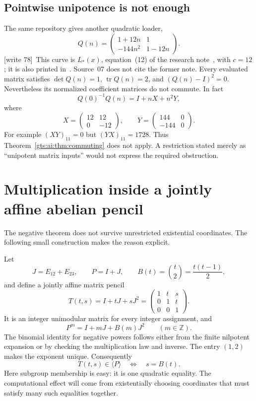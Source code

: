 \documentclass[11pt,letterpaper]{article}
\theoremstyle{definition}
\theoremstyle{remark}
\newcommand{\Z}{\mathbb Z}
\newcommand{\tr}{\operatorname{tr}}
\newcommand{\wtagb}{\textup{[write 78]}}
\begin{document}
\subsection{Pointwise unipotence is not enough}
The same repository gives another quadratic loader,
\begin{equation}\label{gts:ai:eq:Q}
 Q(n)=\begin{pmatrix}1+12n&1\\-144n^2&1-12n\end{pmatrix}.
\end{equation}
\wtagb\ This curve is $L_*(x)$, equation~(12) of the research note~\cite{repo-unip}, with $c=12$; it is also printed in~\cite{repo-comm}. Source~07 does not cite the former note.
Every evaluated matrix satisfies $\det Q(n)=1$, $\tr Q(n)=2$, and $(Q(n)-I)^2=0$. Nevertheless its normalized coefficient matrices do not commute. In fact
\[
 Q(0)^{-1}Q(n)=I+nX+n^2Y,
\]
where
\[
 X=\begin{pmatrix}12&12\\0&-12\end{pmatrix},\qquad
 Y=\begin{pmatrix}144&0\\-144&0\end{pmatrix}.
\]
For example $(XY)_{11}=0$ but $(YX)_{11}=1728$. Thus Theorem~\ref{gts:ai:thm:commuting} does not apply. A restriction stated merely as ``unipotent matrix inputs'' would not express the required obstruction.

\section{Multiplication inside a jointly affine abelian pencil}\label{gts:ai:sec:gadget}
The negative theorem does not survive unrestricted existential coordinates. The following small construction makes the reason explicit.

Let
\[
 J=E_{12}+E_{23},\qquad P=I+J,
 \qquad B(t)=\binom t2=\frac{t(t-1)}2,
\]
and define a jointly affine matrix pencil
\begin{equation}\label{gts:ai:eq:T}
 T(t,s)=I+tJ+sJ^2=
 \begin{pmatrix}1&t&s\\0&1&t\\0&0&1\end{pmatrix}.
\end{equation}
It is an integer unimodular matrix for every integer assignment, and
\begin{equation}\label{gts:ai:eq:Ppowers}
 P^m=I+mJ+B(m)J^2\qquad(m\in\Z).
\end{equation}
The binomial identity for negative powers follows either from the finite nilpotent expansion or by checking the multiplication law and inverse. The entry $(1,2)$ makes the exponent unique. Consequently
\begin{equation}\label{gts:ai:eq:triangularmembership}
 T(t,s)\in\langle P\rangle\quad\Longleftrightarrow\quad s=B(t).
\end{equation}
Here subgroup membership is easy: it is one quadratic equality. The computational effect will come from existentially choosing coordinates that must satisfy many such equalities together.
\end{document}
